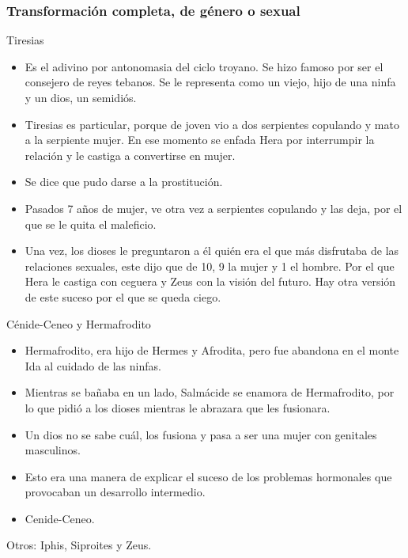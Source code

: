 \subsubsection{Transformación completa, de género o sexual}
Tiresias
\begin{itemize}
	\item Es el adivino por antonomasia del ciclo troyano. Se hizo famoso por ser el consejero de reyes tebanos. Se le representa como un viejo, hijo de una ninfa y un dios, un semidiós.
	\item Tiresias es particular, porque de joven vio a dos serpientes copulando y mato a la serpiente mujer. En ese momento se enfada Hera por interrumpir la relación y le castiga a convertirse en mujer.
	\item Se dice que pudo darse a la prostitución.
	\item Pasados 7 años de mujer, ve otra vez a serpientes copulando y las deja, por el que se le quita el maleficio.
	\item Una vez, los dioses le preguntaron a él quién era el que más disfrutaba de las relaciones sexuales, este dijo que de 10, 9 la mujer y 1 el hombre. Por el que Hera le castiga con ceguera y Zeus con la visión del futuro. Hay otra versión de este suceso por el que se queda ciego.
\end{itemize}

Cénide-Ceneo y Hermafrodito
\begin{itemize}
	\item Hermafrodito, era hijo de Hermes y Afrodita, pero fue abandona en el monte Ida al cuidado de las ninfas.
	\item Mientras se bañaba en un lado, Salmácide se enamora de Hermafrodito, por lo que pidió a los dioses mientras le abrazara que les fusionara.
	\item Un dios no se sabe cuál, los fusiona y pasa a ser una mujer con genitales masculinos.
	\item Esto era una manera de explicar el suceso de los problemas hormonales que provocaban un desarrollo intermedio.
	\item Cenide-Ceneo.
\end{itemize}

Otros: Iphis, Siproites y Zeus.